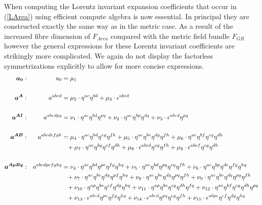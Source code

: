 \documentclass[a4paper,12pt, DIV=14, BCOR=5mm, twoside, headsepline]{scrbook}
\begin{document}
When computing the Lorentz invariant expansion coefficients that occur in (\ref{LArea}) using efficient compute algebra is now essential. In principal they are constructed exactly the same way as in the metric case. As a result of the increased fibre dimension of $F_{Area}$ compared with the metric field bundle $F_{GR}$ however the general expressions for these Lorentz invariant coefficients are strikingly more complicated. We again do not display the factorless symmetrizations explicitly to allow for more concise expressions.
\begin{align}\label{LorentzArea1}
\begin{alignedat}{2}
\boldsymbol{a_0}&: \ \ \ & a_0  &= \mu_1 \\
\\
\boldsymbol{a^{A}}&: \ \ \ & a^{abcd}  &= \mu_2 \cdot \eta^{ac} \eta^{bd} + \mu_{3} \cdot \epsilon^{abcd} \\
\\
\boldsymbol{a^{AI}}&: \ \ \ & a^{abcdpq}  &=  \nu_{1}\cdot\eta^{ac}\eta^{bd}\eta^{pq}+\nu_{2}\cdot\eta^{ac}\eta^{bp}\eta^{dq} + \nu_{3}\cdot\epsilon^{abcd}\eta^{pq}\\
\\
\boldsymbol{a^{AB}}&: \ \ \ & a^{abcdefgh}  &= \mu_{4}\cdot\eta^{ac}\eta^{bd}\eta^{eg}\eta^{fh}+\mu_{5}\cdot\eta^{ac}\eta^{be}\eta^{dg}\eta^{fh}+\mu_{6}\cdot\eta^{ae}\eta^{bf}\eta^{cg}\eta^{dh} \\
& & &\hphantom{=} +\mu_{7}\cdot\eta^{ae}\eta^{bg}\eta^{cf}\eta^{dh} + \mu_{8}\cdot\epsilon^{abcd}\eta^{eg}\eta^{fh}+\mu_{9}\cdot\epsilon^{abef}\eta^{cg}\eta^{dh}\\
\\
\boldsymbol{a^{ApBq}}&: \ \ \ & a^{abcdpefghq}  &=
\nu_{4}\cdot\eta^{ac}\eta^{bd}\eta^{pe}\eta^{fg}\eta^{hq}+\nu_{5}\cdot\eta^{ac}\eta^{bd}\eta^{pq}\eta^{eg}\eta^{fh}+\nu_{6}\cdot\eta^{ac}\eta^{bp}\eta^{de}\eta^{fg}\eta^{hq}\\
& & &\hphantom{=}+\nu_{7}\cdot\eta^{ac}\eta^{be}\eta^{dg}\eta^{pf}\eta^{hq}+\nu_{8}\cdot\eta^{ac}\eta^{be}\eta^{dg}\eta^{pq}\eta^{fh}+\nu_{9}\cdot\eta^{ac}\eta^{be}\eta^{dq}\eta^{pg}\eta^{fh}\\
& & &\hphantom{=}+\nu_{10}\cdot\eta^{ap}\eta^{be}\eta^{cf}\eta^{dg}\eta^{hq}+\nu_{11}\cdot\eta^{ap}\eta^{be}\eta^{cg}\eta^{dh}\eta^{fq}+\nu_{12}\cdot\eta^{ae}\eta^{bf}\eta^{cg}\eta^{dh}\eta^{pq}\\
& & &\hphantom{=} +\nu_{13}\cdot\epsilon^{abcd}\eta^{pe}\eta^{fg}\eta^{hq}+\nu_{14}\cdot\epsilon^{abcd}\eta^{pq}\eta^{eg}\eta^{fh}+\nu_{15}\cdot\epsilon^{abpe}\eta^{cf}\eta^{dg}\eta^{hq}\\

\end{alignedat}
\end{align}
\end{document}
